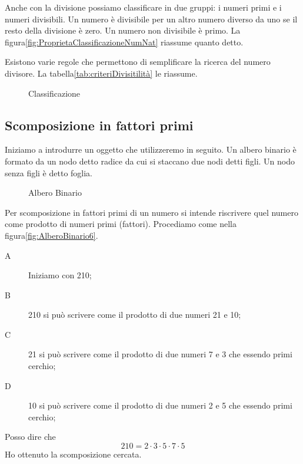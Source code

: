 Anche con la divisione possiamo classificare in due gruppi: i numeri primi e i numeri divisibili. Un numero è divisibile per un altro numero diverso da uno se il resto della divisione è zero. Un numero non divisibile è primo. La figura\nobs\vref{fig:ProprietaClassificazioneNumNat} riassume quanto detto.

Esistono varie regole che permettono di semplificare la ricerca del numero divisore. La tabella\nobs\vref{tab:criteriDivisitilità} le riassume.
\begin{figure} %
	\centering

	\caption{Classificazione}
	\label{fig:ProprietaClassificazioneNumNat}
\end{figure}
\subsection{Scomposizione in fattori primi}
Iniziamo a introdurre un oggetto che utilizzeremo in seguito. Un albero binario è formato da un nodo detto radice da cui si staccano due nodi detti figli. Un nodo senza figli è detto foglia.  
\begin{figure} %
	\centering

	\caption{Albero Binario}
	\label{fig:AlberoBinarioDef}
\end{figure}

Per scomposizione in fattori primi  di un numero si intende riscrivere quel numero come prodotto di numeri primi (fattori). Procediamo come nella figura\nobs\vref{fig:AlberoBinario6}. 
\begin{description}
\item[A] Iniziamo con \num{210};
\item[B] \num{210} si può scrivere come il prodotto di due numeri \num{21} e \num{10};
\item[C] \num{21} si può scrivere come il prodotto di due numeri \num{7} e \num{3} che essendo primi cerchio;
\item[D] \num{10} si può scrivere come il prodotto di due numeri \num{2} e \num{5} che essendo primi cerchio;
\end{description}
Posso dire che \[210=2\cdot 3\cdot 5 \cdot 7 \cdot5 \]Ho ottenuto la scomposizione cercata.

